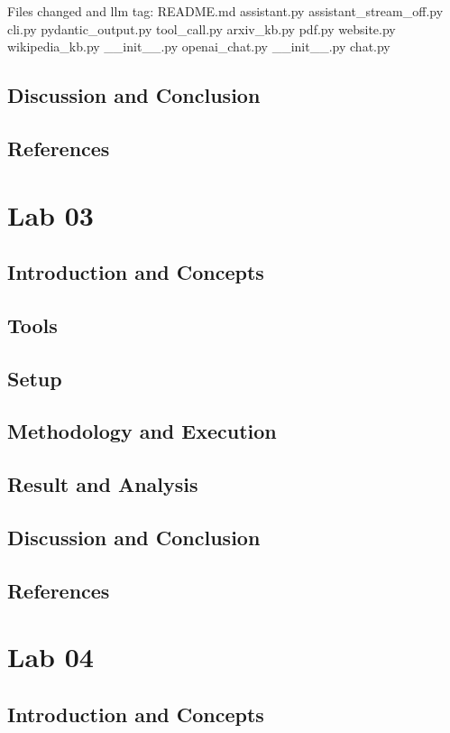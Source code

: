 \documentclass[a4paper,12pt,twoside,english]{all-in-one} %
\begin{document}
Files changed and llm tag:
README.md 
assistant.py 
assistant_stream_off.py 
cli.py 
pydantic_output.py 
tool_call.py 
arxiv_kb.py 
pdf.py 
website.py 
wikipedia_kb.py 
__init__.py 
openai_chat.py 
__init__.py 
chat.py

\subsection{Discussion and Conclusion}
\subsection{References}

\newpage
\section{Lab 03}
\subsection{Introduction and Concepts}
\subsection{Tools}
\subsection{Setup}
\subsection{Methodology and Execution}
\subsection{Result and Analysis}
\subsection{Discussion and Conclusion}
\subsection{References}

\newpage
\section{Lab 04}
\subsection{Introduction and Concepts}
\end{document}
